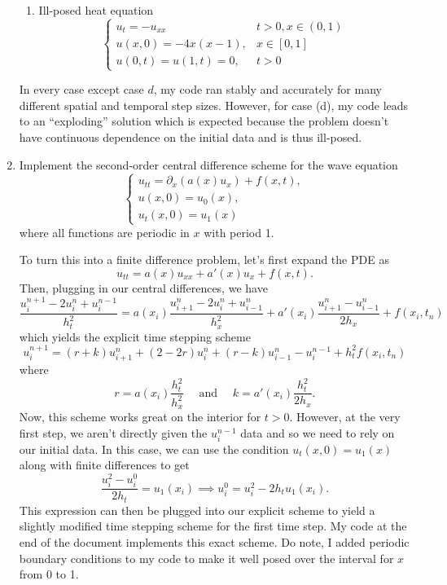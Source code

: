 \documentclass[a4paper,12pt]{article}
\renewcommand{\and}{\text{ and }}
\begin{document}
\begin{enumerate}[label = (\arabic*)]
\begin{enumerate}[label = (\alph*)]
		\item Ill-posed heat equation
			\[
				\begin{cases}
					u_t = -u_{xx} & t > 0, x\in (0,1) \\
					u(x,0) = -4x(x-1), & x \in [0,1] \\
					u(0,t) = u(1,t) = 0, & t > 0
				\end{cases}
			\]
	\end{enumerate}
	In every case except case $ d $, my code ran stably and accurately for many different spatial and temporal step sizes. However, for case (d), my code leads to an ``exploding'' solution which is expected because the problem doesn't have continuous dependence on the initial data and is thus ill-posed.
		
	\newpage
	\item Implement the second-order central difference scheme for the wave equation
	\[
		\begin{cases}
			u_{tt} = \partial_x (a(x) u_x) + f(x,t), \\
			u(x,0) = u_0(x), \\
			u_t(x,0) = u_1(x)
		\end{cases}
	\]
	where all functions are periodic in $ x $ with period 1.
	
	To turn this into a finite difference problem, let's first expand the PDE as
	\[
		u_{tt} = a(x) u_{xx} + a'(x) u_x + f(x,t).
	\]
	Then, plugging in our central differences, we have
	\[
		\frac{u_i^{n + 1} - 2u_i^n + u_i^{n - 1}}{h_t^2} = a(x_i) \frac{u_{i+1}^n - 2u_{i}^n + u_{i - 1}^n}{h_x^2} + a'(x_i) \frac{u_{i+1}^n - u_{i - 1}^n}{2h_x} + f(x_i, t_n)
	\]
	which yields the explicit time stepping scheme
	\[
		u_i^{n + 1} = (r + k) u_{i + 1}^n + (2 - 2r)u_i^n + (r - k)u_{i - 1}^n - u_i^{n - 1} + h_t^2 f(x_i, t_n)
	\]
	where
	\[
		r = a(x_i) \frac{h_t^2}{h_x^2} \quad\and\quad k = a'(x_i) \frac{h_t^2}{2h_x}.
	\]
	Now, this scheme works great on the interior for $ t > 0 $. However, at the very first step, we aren't directly given the $ u_i^{n - 1} $ data and so we need to rely on our initial data. In this case, we can use the condition $ u_t(x, 0) = u_1(x) $ along with finite differences to get
	\[
		\frac{u_i^2 - u_i^0}{2h_t} = u_1(x_i) \implies u_i^0 = u_i^2 - 2h_t u_1(x_i).
	\]
	This expression can then be plugged into our explicit scheme to yield a slightly modified time stepping scheme for the first time step. My code at the end of the document implements this exact scheme. Do note, I added periodic boundary conditions to my code to make it well posed over the interval for $ x $ from 0 to 1.
	

\end{enumerate}
\end{document}
